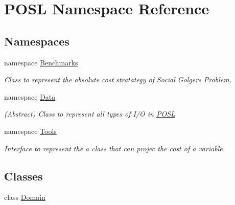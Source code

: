 \hypertarget{namespacePOSL}{}\section{P\+O\+SL Namespace Reference}
\label{namespacePOSL}
\subsection*{Namespaces}
\begin{DoxyCompactItemize}
\item 
namespace \hyperlink{namespacePOSL_1_1Benchmarks}{Benchmarks}
\begin{DoxyCompactList}\small\item\em Class to represent the absolute cost stratategy of Social Golgers Problem. \end{DoxyCompactList}\item 
namespace \hyperlink{namespacePOSL_1_1Data}{Data}
\begin{DoxyCompactList}\small\item\em (Abstract) Class to represent all types of I/O in \hyperlink{namespacePOSL}{P\+O\+SL} \end{DoxyCompactList}\item 
namespace \hyperlink{namespacePOSL_1_1Tools}{Tools}
\begin{DoxyCompactList}\small\item\em Interface to represent the a class that can projec the cost of a variable. \end{DoxyCompactList}\end{DoxyCompactItemize}
\subsection*{Classes}
\begin{DoxyCompactItemize}
\item 
class \hyperlink{classPOSL_1_1Domain}{Domain}
\end{DoxyCompactItemize}
